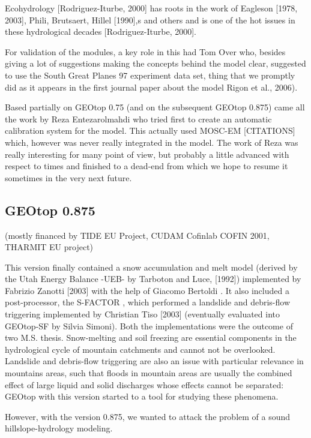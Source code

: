 Ecohydrology [Rodriguez-Iturbe, 2000] has roots in the work of Eagleson [1978, 2003], Phili, Brutsaert, Hillel [1990],s and others and is one of the hot issues in these hydrological decades [Rodriguez-Iturbe, 2000]. 

For validation of the modules, a key role in this had Tom Over who, besides giving a lot of suggestions making the concepts behind the model clear, suggested to use the South Great Planes 97 experiment data set, thing that we promptly did as it appears in the first journal paper about the model Rigon et al., 2006). 

Based partially on GEOtop 0.75 (and on the subsequent GEOtop 0.875) came all the work by Reza Entezarolmahdi who tried first to create an automatic calibration system for the model. This actually used MOSC-EM [CITATIONS] which, however was never really integrated in the model.  The work of Reza was really interesting for many point of view, but probably a little advanced with respect to times and finished to a dead-end from which we hope to resume it sometimes in the very next future. 

\subsection{GEOtop 0.875}
(mostly financed by TIDE EU Project, CUDAM Cofinlab COFIN 2001, THARMIT EU project)

This version finally contained a snow accumulation and melt model (derived by the Utah Energy Balance -UEB- by Tarboton and Luce, [1992]) implemented by Fabrizio Zanotti [2003] with the help of Giacomo Bertoldi .  It also included a post-processor, the S-FACTOR , which performed a landslide and debris-flow triggering implemented by Christian Tiso [2003] (eventually evaluated into GEOtop-SF by Silvia Simoni).  Both the implementations were the outcome of two M.S. thesis.  Snow-melting and soil freezing are essential components in the hydrological cycle of mountain catchments and cannot not be overlooked. Landslide and debris-flow triggering are also an issue with particular relevance in mountains areas, such that floods in mountain areas are usually the combined effect of large liquid and solid discharges whose effects cannot be separated: GEOtop with this version started to a tool for studying these phenomena. 

However, with the version 0.875, we wanted to attack the problem of a sound hillslope-hydrology modeling. 

